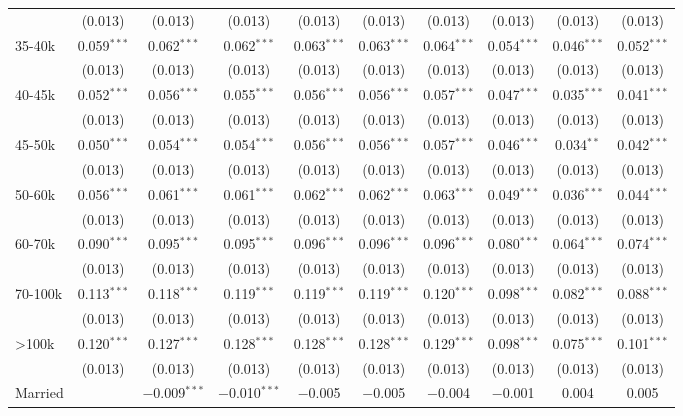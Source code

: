 \begin{table}[!htbp]
\begin{tabular}{@{\extracolsep{5pt}}lccccccccc}
  & (0.013) & (0.013) & (0.013) & (0.013) & (0.013) & (0.013) & (0.013) & (0.013) & (0.013) \\ 
  35-40k & 0.059$^{***}$ & 0.062$^{***}$ & 0.062$^{***}$ & 0.063$^{***}$ & 0.063$^{***}$ & 0.064$^{***}$ & 0.054$^{***}$ & 0.046$^{***}$ & 0.052$^{***}$ \\ 
  & (0.013) & (0.013) & (0.013) & (0.013) & (0.013) & (0.013) & (0.013) & (0.013) & (0.013) \\ 
  40-45k & 0.052$^{***}$ & 0.056$^{***}$ & 0.055$^{***}$ & 0.056$^{***}$ & 0.056$^{***}$ & 0.057$^{***}$ & 0.047$^{***}$ & 0.035$^{***}$ & 0.041$^{***}$ \\ 
  & (0.013) & (0.013) & (0.013) & (0.013) & (0.013) & (0.013) & (0.013) & (0.013) & (0.013) \\ 
  45-50k & 0.050$^{***}$ & 0.054$^{***}$ & 0.054$^{***}$ & 0.056$^{***}$ & 0.056$^{***}$ & 0.057$^{***}$ & 0.046$^{***}$ & 0.034$^{**}$ & 0.042$^{***}$ \\ 
  & (0.013) & (0.013) & (0.013) & (0.013) & (0.013) & (0.013) & (0.013) & (0.013) & (0.013) \\ 
  50-60k & 0.056$^{***}$ & 0.061$^{***}$ & 0.061$^{***}$ & 0.062$^{***}$ & 0.062$^{***}$ & 0.063$^{***}$ & 0.049$^{***}$ & 0.036$^{***}$ & 0.044$^{***}$ \\ 
  & (0.013) & (0.013) & (0.013) & (0.013) & (0.013) & (0.013) & (0.013) & (0.013) & (0.013) \\ 
  60-70k & 0.090$^{***}$ & 0.095$^{***}$ & 0.095$^{***}$ & 0.096$^{***}$ & 0.096$^{***}$ & 0.096$^{***}$ & 0.080$^{***}$ & 0.064$^{***}$ & 0.074$^{***}$ \\ 
  & (0.013) & (0.013) & (0.013) & (0.013) & (0.013) & (0.013) & (0.013) & (0.013) & (0.013) \\ 
  70-100k & 0.113$^{***}$ & 0.118$^{***}$ & 0.119$^{***}$ & 0.119$^{***}$ & 0.119$^{***}$ & 0.120$^{***}$ & 0.098$^{***}$ & 0.082$^{***}$ & 0.088$^{***}$ \\ 
  & (0.013) & (0.013) & (0.013) & (0.013) & (0.013) & (0.013) & (0.013) & (0.013) & (0.013) \\ 
  >100k & 0.120$^{***}$ & 0.127$^{***}$ & 0.128$^{***}$ & 0.128$^{***}$ & 0.128$^{***}$ & 0.129$^{***}$ & 0.098$^{***}$ & 0.075$^{***}$ & 0.101$^{***}$ \\ 
  & (0.013) & (0.013) & (0.013) & (0.013) & (0.013) & (0.013) & (0.013) & (0.013) & (0.013) \\ 
  Married &  & $-$0.009$^{***}$ & $-$0.010$^{***}$ & $-$0.005 & $-$0.005 & $-$0.004 & $-$0.001 & 0.004 & 0.005 \\ 

\end{tabular}
\end{table}
